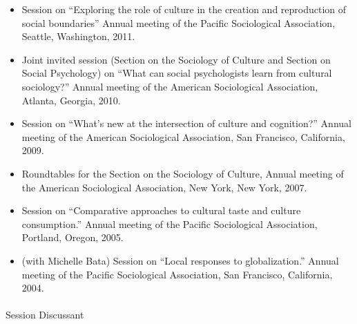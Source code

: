 \documentclass[
]{article}
\makeatletter
\let\oldparagraph\paragraph
\renewcommand{\paragraph}{
    \@ifstar
      \xxxParagraphStar
      \xxxParagraphNoStar
  }
\newcommand{\xxxParagraphStar}[1]{\oldparagraph*{#1}\mbox{}}
\newcommand{\xxxParagraphNoStar}[1]{\oldparagraph{#1}\mbox{}}
\makeatother
\begin{document}
\begin{itemize}
  the American Sociological Association, Las Vegas, Nevada, 2011.
\item
  Session on ``Exploring the role of culture in the creation and
  reproduction of social boundaries'' Annual meeting of the Pacific
  Sociological Association, Seattle, Washington, 2011.
\item
  Joint invited session (Section on the Sociology of Culture and Section
  on Social Psychology) on ``What can social psychologists learn from
  cultural sociology?'' Annual meeting of the American Sociological
  Association, Atlanta, Georgia, 2010.
\item
  Session on ``What's new at the intersection of culture and
  cognition?'' Annual meeting of the American Sociological Association,
  San Francisco, California, 2009.
\item
  Roundtables for the Section on the Sociology of Culture, Annual
  meeting of the American Sociological Association, New York, New York,
  2007.
\item
  Session on ``Comparative approaches to cultural taste and culture
  consumption.'' Annual meeting of the Pacific Sociological Association,
  Portland, Oregon, 2005.
\item
  (with Michelle Bata) Session on ``Local responses to globalization.''
  Annual meeting of the Pacific Sociological Association, San Francisco,
  California, 2004.
\end{itemize}

\paragraph{Session Discussant}\label{session-discussant}
\end{document}
